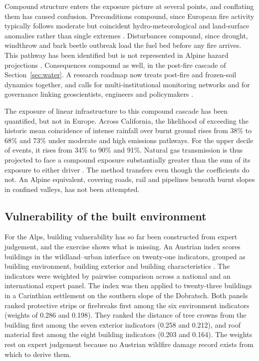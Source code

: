 \documentclass[11pt,a4paper]{article}
\begin{document}
Compound structure enters the exposure picture at several points, and conflating them has caused confusion. Preconditions compound, since European fire activity typically follows moderate but coincident hydro-meteorological and land-surface anomalies rather than single extremes \citep{miller_compounding_2025}. Disturbances compound, since drought, windthrow and bark beetle outbreak load the fuel bed before any fire arrives. This pathway has been identified but is not represented in Alpine hazard projections \citep{gerberding_mapping_2025, bebi_changes_2017}. Consequences compound as well, in the post-fire cascade of Section~\ref{sec:water}. A research roadmap now treats post-fire and frozen-soil dynamics together, and calls for multi-institutional monitoring networks and for governance linking geoscientists, engineers and policymakers \citep{baselt_compound_2026}.

The exposure of linear infrastructure to this compound cascade has been quantified, but not in Europe. Across California, the likelihood of exceeding the historic mean coincidence of intense rainfall over burnt ground rises from 38\% to 68\% and 73\% under moderate and high emissions pathways. For the upper decile of events, it rises from 34\% to 90\% and 91\%. Natural gas transmission is thus projected to face a compound exposure substantially greater than the sum of its exposure to either driver \citep{moftakhari_increasing_2019}. The method transfers even though the coefficients do not. An Alpine equivalent, covering roads, rail and pipelines beneath burnt slopes in confined valleys, has not been attempted.

\subsection{Vulnerability of the built environment}

For the Alps, building vulnerability has so far been constructed from expert judgement, and the exercise shows what is missing. An Austrian index scores buildings in the wildland--urban interface on twenty-one indicators, grouped as building environment, building exterior and building characteristics \citep{papathomakohle_towards_2025}. The indicators were weighted by pairwise comparison across a national and an international expert panel. The index was then applied to twenty-three buildings in a Carinthian settlement on the southern slope of the Dobratsch. Both panels ranked protective strips or firebreaks first among the six environment indicators (weights of 0.286 and 0.198). They ranked the distance of tree crowns from the building first among the seven exterior indicators (0.258 and 0.212), and roof material first among the eight building indicators (0.203 and 0.164). The weights rest on expert judgement because no Austrian wildfire damage record exists from which to derive them.
\end{document}
